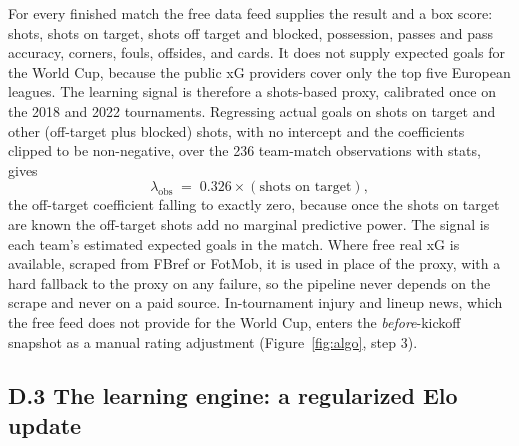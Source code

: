 \documentclass[11pt,letterpaper]{article}
\begin{document}
For every finished match the free data feed supplies the result and a box score: shots, shots on target, shots off target and blocked, possession, passes and pass accuracy, corners, fouls, offsides, and cards. It does not supply expected goals for the World Cup, because the public xG providers cover only the top five European leagues. The learning signal is therefore a shots-based proxy, calibrated once on the 2018 and 2022 tournaments. Regressing actual goals on shots on target and other (off-target plus blocked) shots, with no intercept and the coefficients clipped to be non-negative, over the 236 team-match observations with stats, gives
\[
\lambda_{\text{obs}} \;=\; 0.326 \times (\text{shots on target}),
\]
the off-target coefficient falling to exactly zero, because once the shots on target are known the off-target shots add no marginal predictive power. The signal is each team's estimated expected goals in the match. Where free real xG is available, scraped from FBref or FotMob, it is used in place of the proxy, with a hard fallback to the proxy on any failure, so the pipeline never depends on the scrape and never on a paid source. In-tournament injury and lineup news, which the free feed does not provide for the World Cup, enters the \emph{before}-kickoff snapshot as a manual rating adjustment (Figure~\ref{fig:algo}, step 3).

\subsection*{D.3 \quad The learning engine: a regularized Elo update}
\end{document}
